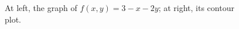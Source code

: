 \begin{pa}
  \begin{figure}[ht]
    \begin{center}
      \hspace*{0.5in}
    \end{center}
      \caption{At left, the graph of $f(x,y) = 3 - x - 2y$; at right, its contour plot.}
      \label{F:10.1.activity.4}
  \end{figure}
      

\end{pa}
